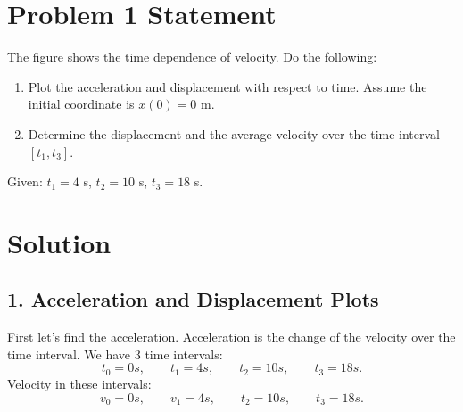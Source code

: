 \documentclass{article}
\begin{document}


\section*{Problem 1 Statement}
The figure shows the time dependence of velocity. Do the following:

\begin{enumerate}
    \item Plot the acceleration and displacement with respect to time. Assume the initial coordinate is $x(0) = 0$ m.
    \item Determine the displacement and the average velocity over the time interval $[t_1, t_3]$.
\end{enumerate}

Given: $t_1 = 4$ s, $t_2 = 10$ s, $t_3 = 18$ s.

\section*{Solution}

\subsection*{1. Acceleration and Displacement Plots}
First let's find the acceleration. Acceleration is the change of the velocity over the time interval.
We have 3 time intervals: 
\[
t_0 = 0s, \qquad t_1 = 4s, \qquad t_2 = 10s, \qquad t_3 = 18s.
\]
Velocity in these intervals:
\[
v_0 = 0s, \qquad v_1 = 4s, \qquad t_2 = 10s, \qquad t_3 = 18s.
\]
\end{document}
